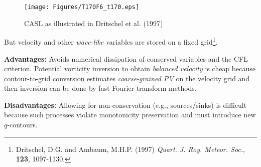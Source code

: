 \begin{center}
\begin{figure}[h!]
\texttt{[image: Figures/T170F6\_t170.eps]}
\label{fig:CASL}
\caption{CASL as illustrated in Dritschel et al. (1997)}
\end{figure}
\end{center}

	But velocity and other {\em wave-like} variables are stored on a fixed
	grid\footnote{\BTi Dritschel, D.G. and Ambaum, M.H.P. (1997) \emph{ Quart. J. Roy. Meteor. Soc.}, {\bf 123},	1097-1130.\ETi}.
	
	{\bf Advantages:} Avoids numerical dissipation of conserved variables
	and the CFL criterion. Potential vorticity inversion to obtain {\em
		balanced velocity} is cheap because contour-to-grid conversion
	estimates {\em coarse-grained PV} on the velocity grid and then inversion
	can be done by fast Fourier transform methods.
	
	{\bf Disadvantages:} Allowing for non-conservation (e.g.,
	sources/sinks) is difficult because such processes violate
	monotonicity preservation and must introduce new $q$-contours.
	
	